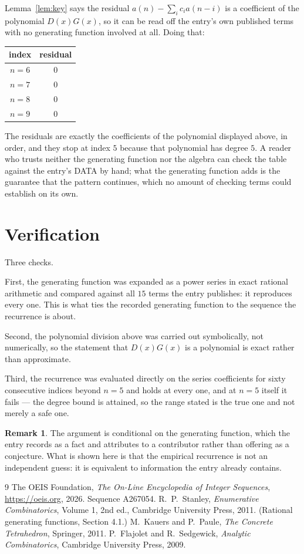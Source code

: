 \documentclass[11pt,a4paper]{article}
\theoremstyle{plain}
\theoremstyle{definition}
\newtheorem{remark}[theorem]{Remark}
\begin{document}
Lemma~\ref{lem:key} says the residual $a(n)-\sum_ic_ia(n-i)$ is a coefficient of the
polynomial $D(x)G(x)$, so it can be read off the entry's own published terms with no
generating function involved at all. Doing that:
\begin{center}
\begin{tabular}{cc}
index & residual \\ \hline
$n=6$ & $0$ \\
$n=7$ & $0$ \\
$n=8$ & $0$ \\
$n=9$ & $0$
\end{tabular}
\end{center}
The residuals are exactly the coefficients of the polynomial displayed above, in order, and
they stop at index $5$ because that polynomial has degree $5$. A reader who trusts
neither the generating function nor the algebra can check the table against the entry's DATA
by hand; what the generating function adds is the guarantee that the pattern continues, which
no amount of checking terms could establish on its own.

\section{Verification}

Three checks.

First, the generating function was expanded as a power series in exact rational arithmetic and
compared against all $15$ terms the entry publishes: it reproduces every one. This is
what ties the recorded generating function to the sequence the recurrence is about.

Second, the polynomial division above was carried out symbolically, not numerically, so the
statement that $D(x)G(x)$ is a polynomial is exact rather than approximate.

Third, the recurrence was evaluated directly on the series coefficients for sixty consecutive
indices beyond $n=5$ and holds at every one, and at $n=5$ itself it fails --- the
degree bound is attained, so the range stated is the true one and not merely a safe one.

\begin{remark}
The argument is conditional on the generating function, which the entry records as a fact and
attributes to a contributor rather than offering as a conjecture. What is shown here is that
the empirical recurrence is not an independent guess: it is equivalent to information the
entry already contains.
\end{remark}

\begin{thebibliography}{9}
 The OEIS Foundation, \emph{The On-Line Encyclopedia of Integer
Sequences}, \url{https://oeis.org}, 2026. Sequence A267054.
 R.~P.~Stanley, \emph{Enumerative Combinatorics}, Volume 1, 2nd ed.,
Cambridge University Press, 2011. (Rational generating functions, Section 4.1.)
 M.~Kauers and P.~Paule, \emph{The Concrete Tetrahedron}, Springer, 2011.
 P.~Flajolet and R.~Sedgewick, \emph{Analytic Combinatorics}, Cambridge
University Press, 2009.
\end{thebibliography}
\end{document}
